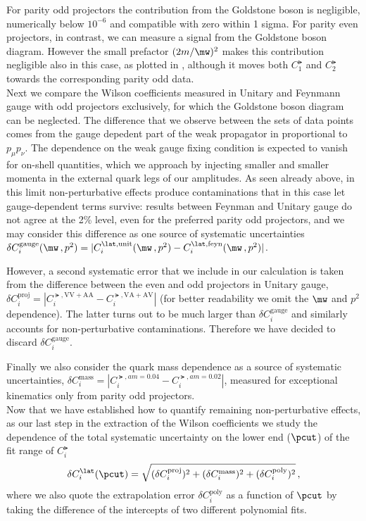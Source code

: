 \documentclass[aps,prd,twocolumn,nofootinbib,showpacs,superscriptaddress]{revtex4-1}
\begin{document}
For parity odd projectors the contribution from the Goldstone boson
is negligible, numerically below $10^{-6}$ and compatible with
zero within 1 sigma.
For parity even projectors, in contrast, 
we can measure a signal from the Goldstone boson diagram. 
However the small prefactor $(2 m/\mw)^2$ makes this contribution
negligible also in this case, as plotted in ,
although it moves both $C_1^\lat$ and $C_2^\lat$ towards
the corresponding parity odd data.\\

Next we compare the Wilson coefficients measured in Unitary and 
Feynmann gauge with odd projectors exclusively, for which 
the Goldstone boson diagram can be neglected. 
The difference that we observe between the sets of data points 
comes from the gauge depedent part of the weak propagator in
 proportional to $p_\mu p_\nu$.
The dependence on the weak gauge fixing condition is expected
to vanish for on-shell quantities, which we approach by injecting smaller and smaller
momenta in the external quark legs of our amplitudes.
As seen already above, in this limit non-perturbative 
effects produce contaminations that in this case 
let gauge-dependent terms survive: results between Feynman and Unitary gauge
do not agree at the 2\% level, even for the preferred parity odd projectors, and 
we may consider this difference as one source of systematic uncertainties 
$\delta C_i^\mathrm{gauge}(\mw\,, p^2)= 
|C_i^{\lat,\mathrm{unit}}(\mw\,, p^2) - C_i^{\lat,\mathrm{feyn}}(\mw\,,p^2) | $.

However, a second systematic error that we include in our calculation is taken from
the difference between the even and odd projectors in Unitary gauge, 
$\delta C_i^\mathrm{proj} = |C_i^{\lat,\mathrm{VV+AA}} - C_i^{\lat,\mathrm{VA+AV}}|$ 
(for better readability we omit the $\mw$ and $p^2$ dependence).
The latter turns out to be much larger than $\delta C_i^\mathrm{gauge}$ 
and similarly accounts for non-perturbative
contaminations. Therefore we have decided to discard $\delta C_i^\mathrm{gauge}$.

Finally we also consider the quark mass dependence
as a source of systematic uncertainties, 
$\delta C_i^\mathrm{mass} = |C_i^{\lat,am=0.04} - C_i^{\lat,am=0.02}|$,
measured for exceptional kinematics only from parity odd projectors.\\

Now that we have established how to quantify remaining non-perturbative
effects, as our last step in the extraction of the Wilson coefficients we
study the dependence of the total systematic uncertainty on 
the lower end ($\pcut$) of the fit range of $C_i^\lat$ 
\begin{equation}
\delta C_i^\lat (\pcut) = \sqrt{(\delta C_i^\mathrm{proj})^2 + (\delta C_i^\mathrm{mass})^2 + 
(\delta C_i^\mathrm{poly})^2 } \,,
\label{eq:syst}
\end{equation}
where we also quote the extrapolation error $\delta C_i^\mathrm{poly}$ 
as a function of $\pcut$ by taking the difference of the 
intercepts of two different polynomial fits.
\end{document}
